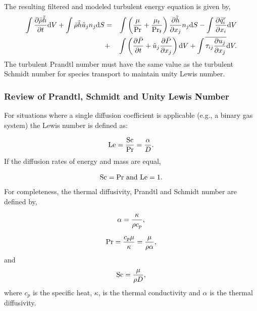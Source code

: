 The resulting filtered and modeled turbulent energy equation is given by,
%
\begin{eqnarray}
\int {{\partial \bar{\rho} \tilde{h}} \over {\partial t}} {\rm d}V
   + \int \bar{\rho} \tilde{h} \tilde{u}_j n_j {\rm d}S 
 &=& \int \left( {\mu \over {\rm Pr}} + {{\mu_t} \over {{\rm Pr}_t}} \right) 
     {{\partial \tilde{h}} \over {\partial x_j}}  n_j {\rm d}S 
   - \int {{\partial \bar{q}_i^r} \over {\partial x_i}} {\rm d}V \nonumber \\
 &+& \int \left({{\partial \bar{P}} \over {\partial t}} + \tilde{u}_j 
     {{\partial \bar{P}} \over {\partial x_j}}\right){\rm d}V
   + \int \overline{\tau_{ij} {{\partial u_j} \over {\partial x_j }}} {\rm d}V.
\label{mod-enth}
\end{eqnarray}
%
The turbulent Prandtl number must have the same value as
the turbulent Schmidt number for species transport to maintain unity Lewis
number.

\subsubsection{Review of Prandtl, Schmidt and Unity Lewis Number}

For situations where a single diffusion coefficient is applicable (e.g., a binary gas system) the Lewis number is defined as:

\begin{eqnarray}
{\rm Le} = {{\rm Sc} \over {\rm Pr}} = {{\alpha} \over {D}}. 
\label{lewisNumber}
\end{eqnarray}
%
If the diffusion rates of energy and mass are equal, 

\begin{eqnarray}
{\rm Sc = Pr \ and \ Le = 1}. 
\label{lewisNumberUnity}
\end{eqnarray}
%
For completeness, the thermal diffusivity, Prandtl and Schmidt number are defined by,

\begin{eqnarray}
\alpha = {{\kappa} \over {\rho c_p}},
\label{thermalDiff}
\end{eqnarray}

\begin{eqnarray}
{\rm Pr} = {{c_p \mu } \over {\kappa}} = {{\mu} \over {\rho \alpha}},
\label{prandtl}
\end{eqnarray}
%
and
\begin{eqnarray}
{\rm Sc} = {{\mu } \over {\rho D}}, 
\label{schmidt}
\end{eqnarray}
where $c_p$ is the specific heat, $\kappa$, is the thermal conductivity and
$\alpha$ is the thermal diffusivity.


